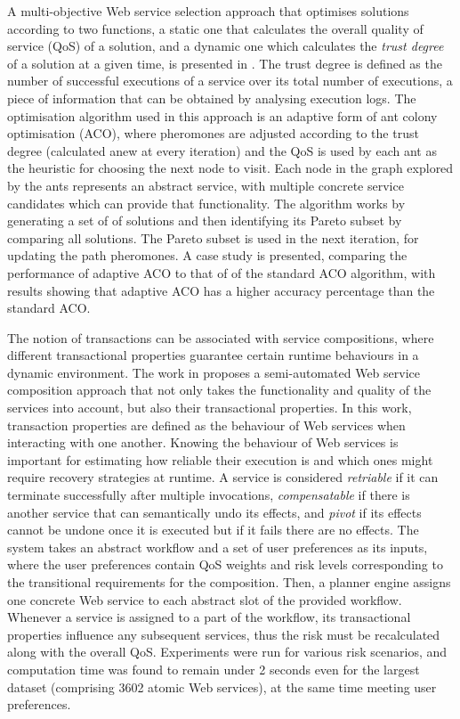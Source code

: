 A multi-objective Web service selection approach that optimises solutions according to two functions, a static one that calculates the overall quality of service (QoS) of a solution, and a dynamic one which calculates the \textit{trust degree} of a solution at a given time, is presented in \cite{wang2014novel}. The trust degree is defined as the number of successful executions of a service over its total number of executions, a piece of information that can be obtained by analysing execution logs. The optimisation algorithm used in this approach is an adaptive form of ant colony optimisation (ACO), where pheromones are adjusted according to the trust degree (calculated anew at every iteration) and the QoS is used by each ant as the heuristic for choosing the next node to visit. Each node in the graph explored by the ants represents an abstract service, with multiple concrete service candidates which can provide that functionality. The algorithm works by generating a set of of solutions and then identifying its Pareto subset by comparing all solutions. The Pareto subset is used in the next iteration, for updating the path pheromones. A case study is presented, comparing the performance of adaptive ACO to that of of the standard ACO algorithm, with results showing that adaptive ACO has a higher accuracy percentage than the standard ACO.

The notion of transactions can be associated with service compositions, where different transactional properties guarantee certain runtime behaviours in a dynamic environment. The work in \cite{el2010tqos} proposes a semi-automated Web service composition approach that not only takes the functionality and quality of the services into account, but also their transactional properties. In this work, transaction properties are defined as the behaviour of Web services when interacting with one another. Knowing the behaviour of Web services is important for estimating how reliable their execution is and which ones might require recovery strategies at runtime. A service is considered \textit{retriable} if it can terminate successfully after multiple invocations, \textit{compensatable} if there is another service that can semantically undo its effects, and \textit{pivot} if its effects cannot be undone once it is executed but if it fails there are no effects. The system takes an abstract workflow and a set of user preferences as its inputs, where the user preferences contain QoS weights and risk levels corresponding to the transitional requirements for the composition. Then, a planner engine assigns one concrete Web service to each abstract slot of the provided workflow. Whenever a service is assigned to a part of the workflow, its transactional properties influence any subsequent services, thus the risk must be recalculated along with the overall QoS. Experiments were run for various risk scenarios, and computation time was found to remain under 2 seconds even for the largest dataset (comprising 3602 atomic Web services), at the same time meeting user preferences.

